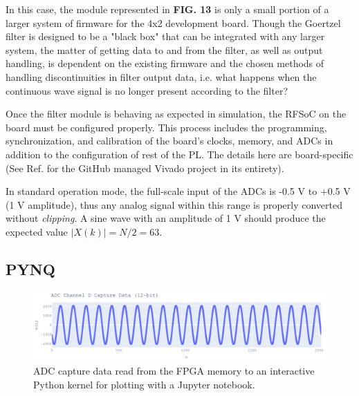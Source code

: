 \documentclass[reprint,amsmath,amssymb]{revtex4-2}
\begin{document}
In this case, the module represented in \textbf{FIG. 13} is only a small portion of a larger system of firmware for the 4x2 development board. Though the Goertzel filter is designed to be a "black box" that can be integrated with any larger system, the matter of getting data to and from the filter, as well as output handling, is dependent on the existing firmware and the chosen methods of handling discontinuities in filter output data, i.e. what happens when the continuous wave signal is no longer present according to the filter?

Once the filter module is behaving as expected in simulation, the RFSoC on the board must be configured properly. This process includes the programming, synchronization, and calibration of the board's clocks, memory, and ADCs in addition to the configuration of rest of the PL. The details here are board-specific (See Ref. \cite{github} for the GitHub managed Vivado project in its entirety).

In standard operation mode, the full-scale input of the ADCs is -0.5 V to +0.5 V (1 V amplitude), thus any analog signal within this range is properly converted without \textit{clipping}. A sine wave with an amplitude of 1 V should produce the expected value $|X(k)| = N/2 = 63$.

\subsection{PYNQ}

\begin{figure}
    \centering
    \includegraphics[width=\linewidth]{figs/ADC_data.png}
    \caption{ADC capture data read from the FPGA memory to an interactive Python kernel for plotting with a Jupyter notebook.}
    \label{fig:16}
\end{figure}
\end{document}

